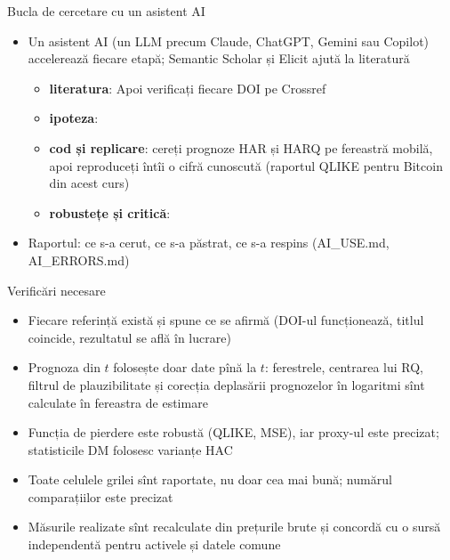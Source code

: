 \begin{frame}{Bucla de cercetare cu un asistent AI}
\itemsize{\footnotesize}
\begin{itemize}
    \item Un asistent AI (un LLM precum Claude, ChatGPT, Gemini sau Copilot) accelerează fiecare etapă; Semantic Scholar și Elicit ajută la literatură
    \begin{itemize}
        \item \textbf{literatura}:  Apoi verificați fiecare DOI pe Crossref
        \item \textbf{ipoteza}: 
        \item \textbf{cod și replicare}: cereți prognoze HAR și HARQ pe fereastră mobilă, apoi reproduceți întîi o cifră cunoscută (raportul QLIKE pentru Bitcoin din acest curs)
        \item \textbf{robustețe și critică}: 
    \end{itemize}
    \item Raportul: ce s-a cerut, ce s-a păstrat, ce s-a respins (AI\_USE.md, AI\_ERRORS.md)
\end{itemize}
\end{frame}

\begin{frame}{Verificări necesare}
\itemsize{\small}
\begin{itemize}
    \item Fiecare referință există și spune ce se afirmă (DOI-ul funcționează, titlul coincide, rezultatul se află în lucrare)
    \item Prognoza din $t$ folosește doar date pînă la $t$: ferestrele, centrarea lui RQ, filtrul de plauzibilitate și corecția deplasării prognozelor în logaritmi sînt calculate în fereastra de estimare
    \item Funcția de pierdere este robustă (QLIKE, MSE), iar proxy-ul este precizat; statisticile DM folosesc varianțe HAC
    \item Toate celulele grilei sînt raportate, nu doar cea mai bună; numărul comparațiilor este precizat
    \item Măsurile realizate sînt recalculate din prețurile brute și concordă cu o sursă independentă pentru activele și datele comune
\end{itemize}
\end{frame}

